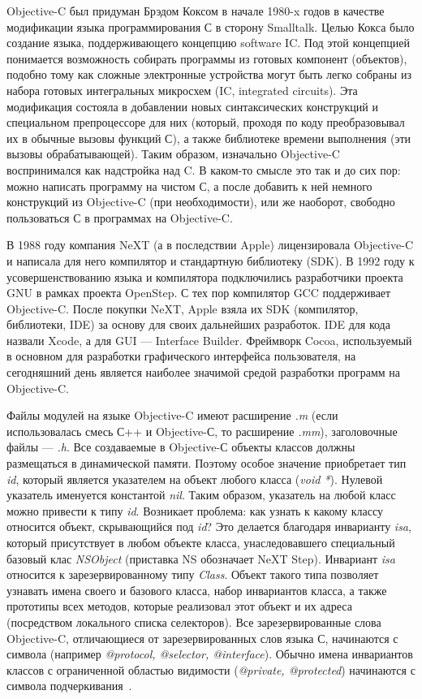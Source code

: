 Objective-C был придуман Брэдом Коксом в начале 1980-x годов
в качестве модификации языка программирования С в сторону Smalltalk.
Целью Кокса было создание языка, поддерживающего концепцию software IC.
Под этой концепцией понимается возможность собирать программы из готовых
компонент (объектов), подобно тому как сложные электронные устройства могут быть
легко собраны из набора готовых интегральных микросхем (IC, integrated circuits).
Эта модификация состояла в добавлении новых синтаксических
конструкций и специальном препроцессоре для них (который, проходя по коду
преобразовывал их в обычные вызовы функций С),
а также библиотеке времени выполнения (эти вызовы обрабатывающей).
Таким образом, изначально Objective-C воспринимался как надстройка над C.
В каком-то смысле это так и до сих пор: можно написать программу на чистом С,
а после добавить к ней немного конструкций из Objective-C (при необходимости),
или же наоборот, свободно пользоваться С в программах на Objective-C.

В 1988 году компания NeXT (а в последствии Apple)
лицензировала Objective-C и написала для него компилятор и
стандартную библиотеку (SDK).
В 1992 году к усовершенствованию языка и компилятора подключились разработчики
проекта GNU в рамках проекта OpenStep. С тех пор компилятор GCC поддерживает Objective-C.
После покупки NeXT, Apple взяла их SDK (компилятор, библиотеки, IDE) за основу
для своих дальнейших разработок. IDE для кода назвали Xcode,
а для GUI --– Interface Builder.
Фреймворк Cocoa, используемый в основном для разработки графического интерфейса пользователя,
на сегодняшний день является наиболее значимой средой разработки программ на Objective-C.

Файлы модулей на языке Objective-C имеют расширение \textit{.m}
(если использовалась смесь С++ и Objective-С, то расширение \textit{.mm}),
заголовочные файлы --– \textit{.h}. Все создаваемые в Objective-С объекты классов
должны размещаться в динамической памяти. Поэтому особое значение приобретает
тип \textit{id}, который является указателем на объект любого класса (\textit{void *}).
Нулевой указатель именуется константой \textit{nil}.
Таким образом, указатель на любой класс можно привести к типу \textit{id}.
Возникает проблема: как узнать к какому классу относится объект,
скрывающийся под \textit{id}? Это делается благодаря инварианту \textit{isa},
который присутствует в любом объекте класса, унаследовавшего специальный
базовый клас \textit{NSObject} (приставка NS обозначает NeXT Step).
Инвариант \textit{isa} относится к зарезервированному типу \textit{Class}.
Объект такого типа позволяет узнавать имена своего и базового класса,
набор инвариантов класса, а также прототипы всех методов,
которые реализовал этот объект и их адреса (посредством локального списка селекторов).
Все зарезервированные слова Objective-C, отличающиеся от зарезервированных
слов языка С, начинаются с символа \@ (например \textit{@protocol, @selector, @interface}).
Обычно имена инвариантов классов с ограниченной
областью видимости (\textit{@private, @protected}) начинаются с
символа подчеркивания~\cite{objective_c_from_scratch, appledoc_ios}.


